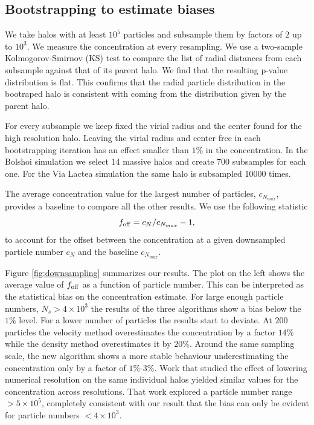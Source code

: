\documentclass{emulateapj}
\begin{document}
\subsection{Bootstrapping to estimate biases}
\label{sec:bootstrapping}

We take halos with at least $10^{5}$ particles and subsample them by
factors of $2$ up to $10^{3}$. 
We measure the concentration at every resampling.
We use a two-sample Kolmogorov-Smirnov (KS) test to  compare the list
of radial distances from each subsample against that of its parent halo.
We find that the resulting p-value distribution is flat.
This confirms that the radial particle distribution in the bootraped
halo is consistent with coming from the distribution given by the
parent halo.  

For every subsample we keep fixed the virial radius and the center
found for the high resolution halo.
Leaving the virial radius and center free in each bootstrapping
iteration has an effect smaller than $1\%$ in the concentration. 
In the Bolshoi simulation we select 14 massive halos and create 700
subsamples for each one.  
For the Via Lactea simulation the same halo is subsampled 10000
times. 

The average concentration value for the largest number of particles,
$c_{N_{max}}$, provides a baseline to compare all the other results.  
We use the following statistic
\begin{equation}
f_{\rm off} = c_{N} / c_{N_{max}} - 1,
\label{eq:f_off}
\end{equation}
to account for the offset between the concentration at a given
downsampled particle number $c_{N}$ and the baseline $c_{N_{max}}$.


Figure \ref{fig:downsampling} summarizes our results.  
The plot on the left shows the average value of $f_{\rm off}$ as a
function of particle number.  
This can be interpreted as the statistical bias on the concentration
estimate. 
For large enough particle numbers, $N_{s}>4\times 10^3$ the results of
the three algorithms show a bias below the $1\%$ level.
For a lower number of particles the results start to deviate.
At $200$ particles the velocity method overestimates the concentration
by a factor $14\%$ while the density method overestimates it by $20\%$.
Around the same sampling scale, the new algorithm shows a more stable
behaviour underestimating the concentration only by a factor of
$1\%$-$3\%$.
Work  that studied the effect of
lowering numerical resolution on the same individual halos
\citep{2008MNRAS.391.1685S} yielded similar values for the
concentration across resolutions.  That work  explored a particle
number range $>5\times 10^5$, completely consistent with our result that the
bias can only be evident for particle numbers $<4\times 10^3$. 
\end{document}
